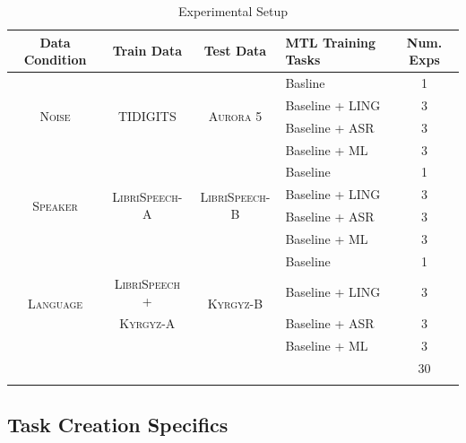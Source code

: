 \documentclass[10pt,a4paper]{article}
\begin{document}
\begin{table}[htbp]
  \centering
  \begin{adjustbox}{width=.95\textwidth}
    \begin{tabular}{ccclc}
      \toprule
      \textbf{Data Condition} & \textbf{Train Data} & \textbf{Test Data} & \textbf{MTL Training Tasks} & \textbf{Num. Exps} \\
      \midrule
      \multirow{4}{*}{\textsc{Noise}} & \multirow{4}{*}{\textsc{TIDIGITS}} & \multirow{4}{*}{\textsc{Aurora 5}} & Basline & 1\\
      & & & Baseline + LING & 3   \\
      & & & Baseline + ASR  & 3  \\
      & & & Baseline + ML   & 3  \\
      \midrule
      \multirow{4}{*}{\textsc{Speaker}} & \multirow{4}{*}{\textsc{LibriSpeech-A}} & \multirow{4}{*}{\textsc{LibriSpeech-B}} & Baseline & 1 \\
      & & & Baseline + LING & 3  \\
      & & & Baseline + ASR  & 3  \\
      & & & Baseline + ML   & 3  \\     \midrule
      \multirow{4}{*}{\textsc{Language}} & & \multirow{4}{*}{\textsc{Kyrgyz-B}} & Baseline & 1\\
      & \textsc{LibriSpeech +} & & Baseline + LING  & 3 \\
      &  \textsc{Kyrgyz-A} & & Baseline + ASR   & 3 \\
      & & & Baseline + ML & 3 \\
      \midrule
      &&&& 30\\
      \bottomrule\\
    \end{tabular}
    \label{table:data}
  \end{adjustbox}
  
  \caption{Experimental Setup}
  
\end{table}


\newpage

\subsection{Task Creation Specifics}
\end{document}
